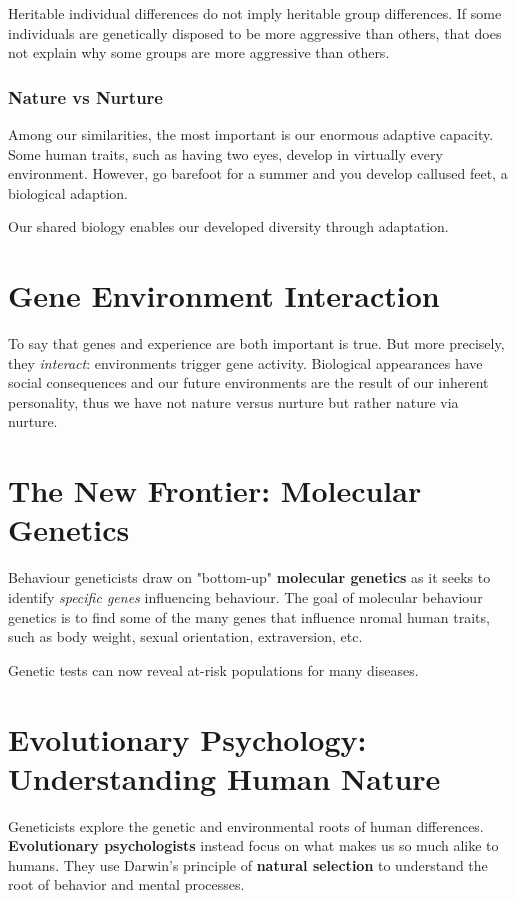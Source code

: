 \documentclass[12pt]{article}
\begin{document}
Heritable individual differences do not imply heritable group differences. If some individuals are genetically disposed to be more aggressive than others, that does not explain why some groups are more aggressive than others.

\subsubsection*{Nature vs Nurture}
Among our similarities, the most important is our enormous adaptive capacity. Some human traits, such as having two eyes, develop in virtually every environment. However, go barefoot for a summer and you develop callused feet, a biological adaption.

Our shared biology enables our developed diversity through adaptation.

\section*{Gene Environment Interaction}
To say that genes and experience are both important is true. But more precisely, they \textit{interact}: environments trigger gene activity. Biological appearances have social consequences and our future environments are the result of our inherent personality, thus  we have not nature versus nurture but rather nature via nurture.

\section*{The New Frontier: Molecular Genetics}
Behaviour geneticists draw on "bottom-up" \textbf{molecular genetics} as it seeks to identify \textit{specific genes} influencing behaviour. The goal of molecular behaviour genetics is to find some of the many genes that influence nromal human traits, such as body weight, sexual orientation, extraversion, etc.

Genetic tests can now reveal at-risk populations for many diseases.

\section*{Evolutionary Psychology: Understanding Human Nature}
Geneticists explore the genetic and environmental roots of human differences. \textbf{Evolutionary psychologists} instead focus on what makes us so much alike to humans. They use Darwin's principle of \textbf{natural selection} to understand the root of behavior and mental processes.
\end{document}
